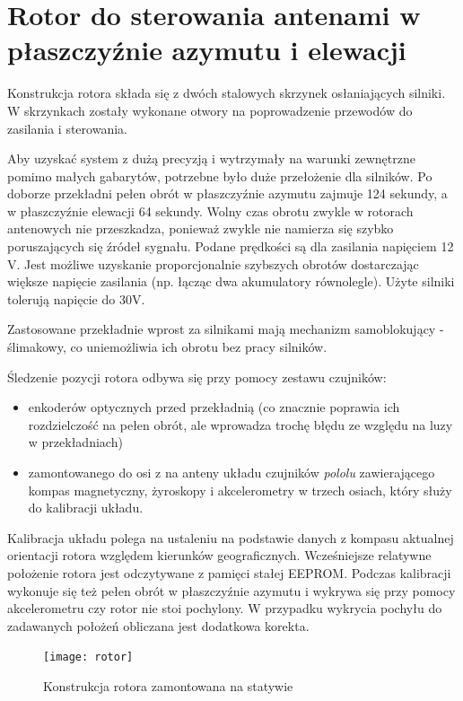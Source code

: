 \section{Rotor do sterowania antenami w płaszczyźnie azymutu i elewacji}

Konstrukcja rotora składa się z dwóch stalowych skrzynek osłaniających silniki. W skrzynkach zostały wykonane otwory na poprowadzenie przewodów do zasilania i sterowania.

Aby uzyskać system z dużą precyzją i wytrzymały na warunki zewnętrzne pomimo małych gabarytów, potrzebne było duże przełożenie dla silników. Po doborze przekładni pełen obrót w płaszczyźnie azymutu zajmuje 124 sekundy, a w płaszczyźnie elewacji 64 sekundy. Wolny czas obrotu zwykle w rotorach antenowych nie przeszkadza, ponieważ zwykle nie namierza się szybko poruszających się źródeł sygnału. Podane prędkości są dla zasilania napięciem 12 V. Jest możliwe uzyskanie proporcjonalnie szybszych obrotów dostarczając większe napięcie zasilania (np. łącząc dwa akumulatory równolegle). Użyte silniki tolerują napięcie do 30V.

Zastosowane przekładnie wprost za silnikami mają mechanizm samoblokujący - ślimakowy, co uniemożliwia ich obrotu bez pracy silników.

Śledzenie pozycji rotora odbywa się przy pomocy zestawu czujników: 
\begin{itemize}
 \item enkoderów optycznych przed przekładnią (co znacznie poprawia ich rozdzielczość na pełen obrót, ale wprowadza trochę błędu ze względu na luzy w przekładniach)
 \item zamontowanego do osi z na anteny układu czujników \emph{pololu} zawierającego kompas magnetyczny, żyroskopy i akcelerometry w trzech osiach, który służy do kalibracji układu.
\end{itemize}

Kalibracja układu polega na ustaleniu na podstawie danych z kompasu aktualnej orientacji rotora względem kierunków geograficznych. Wcześniejsze relatywne położenie rotora jest odczytywane z pamięci stałej EEPROM. Podczas kalibracji wykonuje się też pełen obrót w płaszczyźnie azymutu i wykrywa się przy pomocy akcelerometru czy rotor nie stoi pochylony. W przypadku wykrycia pochyłu do zadawanych położeń obliczana jest dodatkowa korekta.

\begin{figure}[!htbp]
 \texttt{[image: rotor]}
 \centering
 \caption{Konstrukcja rotora zamontowana na statywie}
\end{figure}

